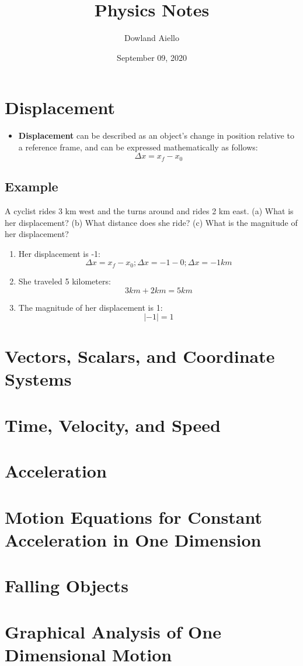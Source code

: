 \documentclass{article}
\begin{document}
\title{Physics Notes}
\author{Dowland Aiello}
\date{September 09, 2020}

\maketitle
\tableofcontents
\fancyhf{}

\newpage

\section{Displacement}

\begin{itemize}
	\item \textbf{Displacement} can be described as an object's change in position relative to a reference frame,
		and can be expressed mathematically as follows:
		\[ \Delta x = x_f - x_0 \]
\end{itemize}

\subsection{Example}

A cyclist rides 3 km west and the turns around and rides 2 km east. (a) What is
her displacement? (b) What distance does she ride? (c) What is the magnitude of
her displacement?

\begin{enumerate}
	\item Her displacement is -1:
		\[ \Delta x = x_f - x_0; \Delta x = -1 - 0; \Delta x = -1 km \]
	\item She traveled 5 kilometers:
		\[ 3km + 2km = 5km \]
	\item The magnitude of her displacement is 1:
		\[ \lvert -1 \rvert = 1 \]
\end{enumerate}

\section{Vectors, Scalars, and Coordinate Systems}

\section{Time, Velocity, and Speed}

\section{Acceleration}

\section{Motion Equations for Constant Acceleration in One Dimension}

\section{Falling Objects}

\section{Graphical Analysis of One Dimensional Motion}
\end{document}
